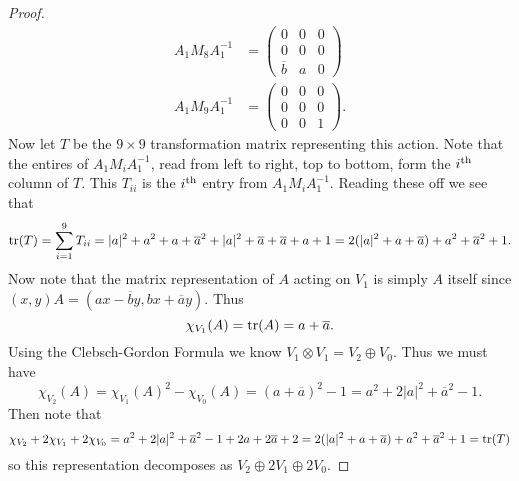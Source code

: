 \documentclass{article}
\newcommand{\tr}{\textup{tr}}
\begin{document}
\begin{proof}
\begin{align*}
A_1 M_8 A_1^{-1} &= \left ( \begin{array}{ccc} 0 & 0 & 0\\ 0 & 0 & 0\\ \overline{b} & a & 0 \end{array} \right )\\
A_1 M_9 A_1^{-1} &= \left ( \begin{array}{ccc} 0 & 0 & 0\\ 0 & 0 & 0\\ 0 & 0 & 1 \end{array} \right ).
\end{align*}
Now let $T$ be the $9 \times 9$ transformation matrix representing this action. Note that the entires of $A_1 M_i A_1^{-1}$, read from left to right, top to bottom, form the $i^{\textup{th}}$ column of $T$. This $T_{ii}$ is the $i^{\textup{th}}$ entry from $A_1 M_i A_1^{-1}$. Reading these off we see that
\[
\tr(T) = \sum_{i=1}^9 T_{ii} = |a|^2 + a^2 + a + \overline{a}^2 + |a|^2 + \overline{a} + \overline{a} + a + 1 = 2 (|a|^2 + a + \overline{a}) + a^2 + \overline{a}^2 + 1.
\]
Now note that the matrix representation of $A$ acting on $V_1$ is simply $A$ itself since $(x,y)A = (ax - \overline{b}y, bx + \overline{a}y)$. Thus
\[
\chi_{V_1}(A) = \tr(A) = a + \overline{a}.
\]
Using the Clebsch-Gordon Formula we know $V_1 \otimes V_1 = V_2 \oplus V_0$. Thus we must have
\[
\chi_{V_2}(A) = \chi_{V_1}(A)^2 - \chi_{V_0}(A) = (a + \overline{a})^2 - 1 = a^2 + 2|a|^2 + \overline{a}^2 - 1.
\]
Then note that
\[
\chi_{V_2} + 2 \chi_{V_1} + 2\chi_{V_0} = a^2 + 2|a|^2 + \overline{a}^2 - 1 + 2a + 2 \overline{a} + 2 = 2(|a|^2 + a + \overline{a}) + a^2 + \overline{a}^2 + 1 = \tr(T)
\]
so this representation decomposes as $V_2 \oplus 2V_1 \oplus 2V_0$.
\end{proof}
\end{document}

